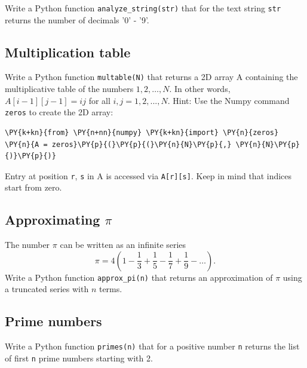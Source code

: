 Write a Python function {\tt analyze\_string(str)} that for the text string {\tt str}
returns the number of decimals '0' - '9'. 


\subsection{Multiplication table}

Write a Python function {\tt multable(N)} that returns a 2D array 
A containing the multiplicative table of the numbers $1, 2, \ldots, N$. 
In other words, $A[i-1][j-1] = ij$ for all $i, j = 1, 2, ..., N$. Hint: Use 
the Numpy command {\tt zeros} to create the 2D array:

\begin{Verbatim}[commandchars=\\\{\}]
\PY{k+kn}{from} \PY{n+nn}{numpy} \PY{k+kn}{import} \PY{n}{zeros}
\PY{n}{A = zeros}\PY{p}{(}\PY{p}{(}\PY{n}{N}\PY{p}{,} \PY{n}{N}\PY{p}{)}\PY{p}{)}
\end{Verbatim}
Entry at position {\tt r}, {\tt s} in A is accessed via {\tt A[r][s]}. Keep in mind that
indices start from zero. 
 

\subsection{Approximating $\pi$}

The number $\pi$ can be written as an infinite series 
$$
\pi = 4\left(1 - \frac{1}{3} + \frac{1}{5} - \frac{1}{7} + \frac{1}{9} - \ldots     \right).
$$
Write a Python function {\tt approx\_pi(n)} that returns an approximation 
of $\pi$ using a truncated series with $n$ terms.


\subsection{Prime numbers}

Write a Python function {\tt primes(n)} that for a positive number {\tt n} returns the list 
of first {\tt n} prime numbers starting with 2. 


